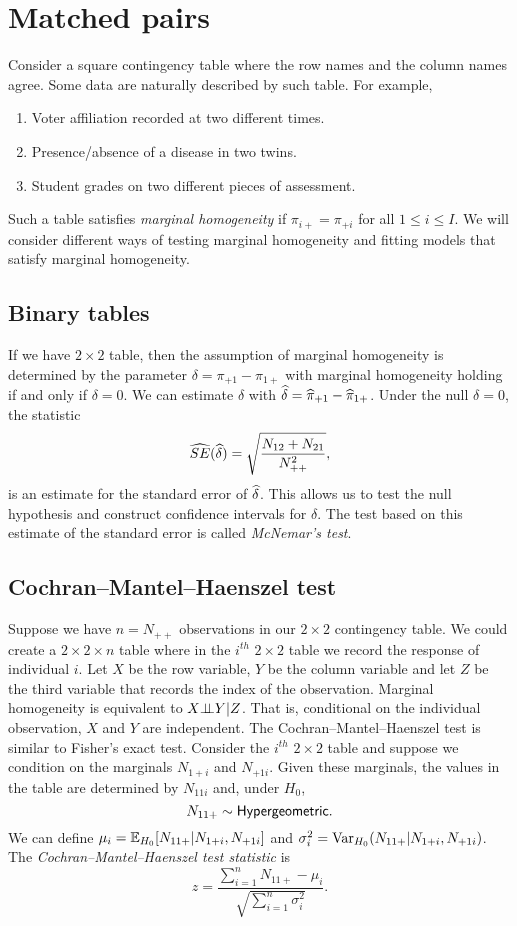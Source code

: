 \section{Matched pairs}
Consider a square contingency table where the row names and the column names agree. Some data are naturally described by such table. For example,
\begin{enumerate}
    \item Voter affiliation recorded at two different times.
    \item Presence/absence of a disease in two twins.
    \item Student grades on two different pieces of assessment.
\end{enumerate}
Such a table satisfies \emph{marginal homogeneity} if $\pi_{i+}=\pi_{+i}$ for all $1 \le i \le I$. We will consider different ways of testing marginal homogeneity and fitting models that satisfy marginal homogeneity. 
\subsection{Binary tables}
If we have $2 \times 2$ table, then the assumption of marginal homogeneity is determined by the parameter $\delta = \pi_{+1}-\pi_{1+}$ with marginal homogeneity holding if and only if $\delta = 0$. We can estimate $\delta$ with $\widehat{\delta} = \widehat{\pi}_{+1}-\widehat{\pi}_{1+}$. Under the null $\delta = 0$, the statistic 
\[\widehat{SE}(\widehat{\delta}) = \sqrt{\frac{N_{12}+N_{21}}{N_{++}^2}}, \]
is an estimate for the standard error of $\widehat{\delta}$. This allows us to test the null hypothesis and construct confidence intervals for $\delta$. The test based on this estimate of the standard error is called \emph{McNemar's test}. 
\subsection{Cochran--Mantel--Haenszel test}
Suppose we have $n = N_{++}$ observations in our $2 \times 2$ contingency table. We could create a $2 \times 2 \times n$ table where in the $i^{th}$ $2 \times 2$ table we record the response of individual $i$. Let $X$ be the row variable, $Y$ be the column variable and let $Z$ be the third variable that records the index of the observation. Marginal homogeneity is equivalent to $X {\perp\!\!\!\perp} Y | Z$. That is, conditional on the individual observation, $X$ and $Y$ are independent. The Cochran--Mantel--Haenszel test is similar to Fisher's exact test. Consider the $i^{th}$ $2 \times 2$ table and suppose we condition on the marginals $N_{1+i}$ and $N_{+1i}$. Given these marginals, the values in the table are determined by $N_{11i}$ and, under $H_0$,
\[N_{11+} \sim \mathsf{Hypergeometric}. \]
We can define $\mu_{i} = {\mathbb{E}}_{H_0}[N_{11+}|N_{1+i},N_{+1i}]$ and $\sigma^2_i = \operatorname{Var}_{H_0}(N_{11+}|N_{1+i},N_{+1i})$. The \emph{Cochran--Mantel--Haenszel test statistic} is 
\[z = \frac{\sum_{i=1}^n N_{11+}-\mu_{i}}{\sqrt{\sum_{i=1}^n \sigma^2_i}}.\]

